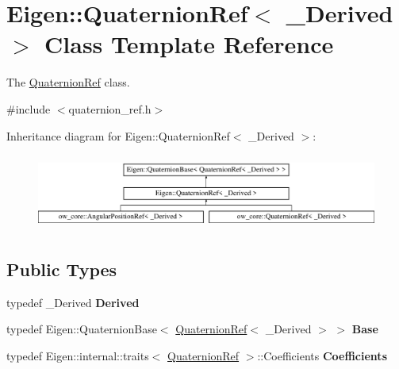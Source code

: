 \hypertarget{classEigen_1_1QuaternionRef}{}\section{Eigen\+:\+:Quaternion\+Ref$<$ \+\_\+\+Derived $>$ Class Template Reference}
\label{classEigen_1_1QuaternionRef}


The \hyperlink{classEigen_1_1QuaternionRef}{Quaternion\+Ref} class.  




{\ttfamily \#include $<$quaternion\+\_\+ref.\+h$>$}

Inheritance diagram for Eigen\+:\+:Quaternion\+Ref$<$ \+\_\+\+Derived $>$\+:\begin{figure}[H]
\begin{center}
\leavevmode
\includegraphics[height=2.537765cm]{d7/d7b/classEigen_1_1QuaternionRef}
\end{center}
\end{figure}
\subsection*{Public Types}
\begin{DoxyCompactItemize}
\item 
typedef \+\_\+\+Derived {\bfseries Derived}\hypertarget{classEigen_1_1QuaternionRef_ae01d4bb6ac378f260ed60b076cadf7e8}{}\label{classEigen_1_1QuaternionRef_ae01d4bb6ac378f260ed60b076cadf7e8}

\item 
typedef Eigen\+::\+Quaternion\+Base$<$ \hyperlink{classEigen_1_1QuaternionRef}{Quaternion\+Ref}$<$ \+\_\+\+Derived $>$ $>$ {\bfseries Base}\hypertarget{classEigen_1_1QuaternionRef_a4eb09c1c2266a2a7d36fe6a8d9bd1f44}{}\label{classEigen_1_1QuaternionRef_a4eb09c1c2266a2a7d36fe6a8d9bd1f44}

\item 
typedef Eigen\+::internal\+::traits$<$ \hyperlink{classEigen_1_1QuaternionRef}{Quaternion\+Ref} $>$\+::Coefficients {\bfseries Coefficients}\hypertarget{classEigen_1_1QuaternionRef_a5f3aa5e5a4749058a47b2c491fc8adde}{}\label{classEigen_1_1QuaternionRef_a5f3aa5e5a4749058a47b2c491fc8adde}

\end{DoxyCompactItemize}
